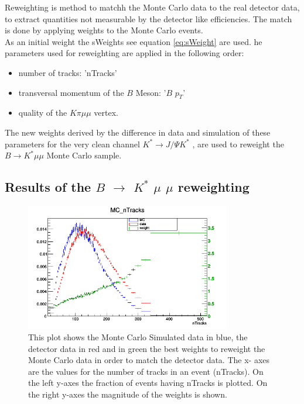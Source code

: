 \documentclass[english]{uzhpub}
\begin{document}
Reweighting is method to matchh the Monte Carlo data to the real detector data, to extract quantities not measurable by the detector like efficiencies. The match is done by applying weights to the Monte Carlo events. \\
As an initial weight the sWeights see equation \ref{eq:sWeight} are used. he parameters used for reweighting are applied in the following order:
\begin{itemize}
  \item number of tracks: 'nTracks'
  \item transversal momentum of the $B$ Meson: '$B$ $p_T$'
  \item quality of the $K \pi \mu \mu$ vertex.
\end{itemize}
The new weights derived by the difference in data and simulation of these parameters for the very clean channel $K^* \rightarrow J/ \Psi K^{*}$ \cite{bib:JPsi}, are used to reweight the $B \rightarrow K^* \mu \mu$ Monte Carlo sample.

\subsection{Results of the $B$ $\rightarrow$ $K^{*}$ $\mu$ $\mu$ reweighting}

\begin{figure}[H]
\centering
\includegraphics[width=0.8\textwidth]{Reweighting/nTracksw}
\caption{This plot shows the Monte Carlo Simulated data in blue, the detector data in red and in green the best weights to reweight the Monte Carlo data in order to match the detector data. The x- axes are the values for the number of tracks in an event (nTracks). On the left y-axes the fraction of events having nTracks is plotted. On the right y-axes the magnitude of the weights is shown.}
\label{fig:nTracksw}
\end{figure}
\end{document}

